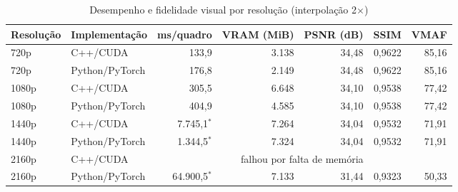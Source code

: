 \begin{table}[htb]
\centering
\caption{Desempenho e fidelidade visual por resolução (interpolação 2$\times$)}
\label{tab:resultados_gta}
\small
\begin{tabular}{llrrrrr}
\toprule
\textbf{Resolução} & \textbf{Implementação} & \textbf{ms/quadro} & \textbf{VRAM (MiB)} & \textbf{PSNR (dB)} & \textbf{SSIM} & \textbf{VMAF} \\
\midrule
720p & C++/CUDA & 133,9 & 3.138 & 34,48 & 0,9622 & 85,16 \\
720p & Python/PyTorch & 176,8 & 2.149 & 34,48 & 0,9622 & 85,16 \\
\midrule
1080p & C++/CUDA & 305,5 & 6.648 & 34,10 & 0,9538 & 77,42 \\
1080p & Python/PyTorch & 404,9 & 4.585 & 34,10 & 0,9538 & 77,42 \\
\midrule
1440p & C++/CUDA & 7.745,1$^{*}$ & 7.264 & 34,04 & 0,9532 & 71,91 \\
1440p & Python/PyTorch & 1.344,5$^{*}$ & 7.324 & 34,04 & 0,9532 & 71,91 \\
\midrule
2160p & C++/CUDA & \multicolumn{5}{c}{falhou por falta de memória} \\
2160p & Python/PyTorch & 64.900,5$^{*}$ & 7.133 & 31,44 & 0,9323 & 50,33 \\
\bottomrule
\end{tabular}
\end{table}
